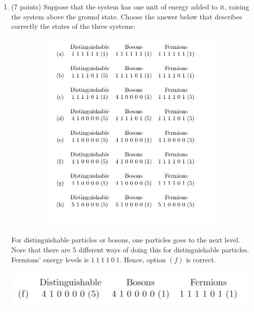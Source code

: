 \documentclass[fleqn]{article}
\begin{document}
\begin{enumerate}
    \pagebreak

    \item (7 points) Suppose that the system has one unit of energy added to it, raising the system above
    the ground state. Choose the answer below that describes correctly the states of the three
    systems:
    \begin{center}
      \includegraphics[height=10cm, width=15cm]{2.JPG}
    \end{center}

      \textcolor{hwColor}{
        For distinguishable particles or bosons, one particles goes to the next level. Nore that there are $5$ different ways of doing this for distinguishable particles.
        Fermions' energy levels is $1 ~ 1 ~ 1 ~ 1 ~ 0 ~ 1$. Hence, option $(f)$ is correct.
      }
      \begin{center}
        \includegraphics[height=2cm, width=13cm]{Answer2.JPG}
      \end{center}

    \pagebreak


\end{enumerate}
\end{document}
